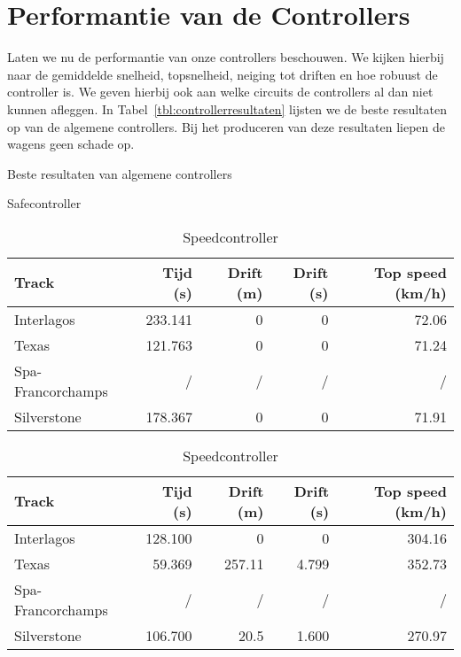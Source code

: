 \section{Performantie van de Controllers}
\label{sec:performance}
Laten we nu de performantie van onze controllers beschouwen. We kijken hierbij naar de gemiddelde snelheid, topsnelheid, neiging tot driften en hoe robuust de controller is. We geven hierbij ook aan welke circuits de controllers al dan niet kunnen afleggen. In Tabel~\ref{tbl:controllerresultaten} lijsten we de beste resultaten op van de algemene controllers. Bij het produceren van deze resultaten liepen de wagens geen schade op.

\begin{table}
	\centering
	\caption{Beste resultaten van algemene controllers}
	\label{tbl:controllerresultaten}
	
	\begin{subtable}{\linewidth}
   		\centering
   		\caption{Safecontroller}
   		\label{tbl:resultssafe}
       	\begin{tabular}{lrrrr}
        	\toprule
        	Track             & Tijd (s) & Drift (m) & Drift (s) & Top speed 
        	(km/h) \\
        	\midrule
        	Interlagos        & 233.141 & 0 & 0 & 72.06 \\ 
        	Texas             & 121.763 & 0 & 0 & 71.24 \\
        	Spa-Francorchamps &       / & / & / & / \\
        	Silverstone       & 178.367 & 0 & 0 & 71.91 \\
        	\bottomrule
    	\end{tabular}
   	\end{subtable}
   	
	\begin{subtable}{\linewidth}
   		\centering
   		\caption{Speedcontroller}
   		\label{tbl:resultsspeed}
   		\begin{tabular}{lrrrr}
    		\toprule
        	Track             & Tijd (s) & Drift (m) & Drift (s) & Top speed  
        	(km/h) \\
        	\midrule
        	Interlagos        & 128.100 &      0 &     0 & 304.16 \\
        	Texas             &  59.369 & 257.11 & 4.799 & 352.73 \\
        	Spa-Francorchamps &       / &      / &     / &      / \\
        	Silverstone       & 106.700 &   20.5 & 1.600 & 270.97 \\
        	\bottomrule
    	\end{tabular}
   	\end{subtable}
  	   	

\end{table}
